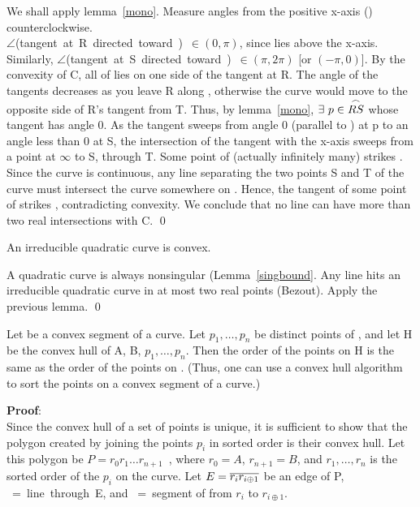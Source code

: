 We shall apply lemma~\ref{mono}.  Measure angles from the positive
x-axis () counterclockwise.\\
$\angle$(tangent~at~R~directed~toward~)~$\in (0,\pi)$, since 
lies above the x-axis.
Similarly, $\angle$(tangent~at~S~directed~toward~)~$\in (\pi,2\pi)$
[or $(-\pi,0)$].
By the convexity of C, all of  lies on one side of the tangent
at R.
\hence The angle of the tangents decreases as you leave R along , 
otherwise the curve would move to the opposite side of R's tangent from T.
Thus, by lemma~\ref{mono}, $\exists~p \in \mbox{$\stackrel{\frown}{RS}$}$ whose tangent has
angle 0.  As the tangent sweeps from angle 0 (parallel to ) at p
to an angle less than 0 at S, the intersection of the tangent with the 
x-axis  sweeps from a point at $\infty$ to S, through T.
\hence Some point of  (actually infinitely many) strikes .
Since the curve is continuous, any line separating the two points S and T
of the curve must intersect the curve somewhere on .  Hence, the 
tangent of some point of  strikes , 
contradicting convexity.
We conclude that no line can have more than two real intersections
with C.
\qed
\begin{corollary}
An irreducible quadratic curve is convex.
\end{corollary}
\proof
A quadratic curve is always nonsingular (Lemma~\ref{singbound}.
Any line hits an irreducible quadratic curve in at most two real
points (Bezout).  Apply the previous lemma.
\qed
\begin{lemma}\nopagebreak
Let  be a convex segment of a curve.  Let $p_{1},\ldots,p_{n}$
be distinct points of , and let H be the convex hull of A, B, 
$p_{1},\ldots,p_{n}$.  Then the order of the points on H is the same
 as the order of the points on .  (Thus, one can use a convex hull
algorithm to sort the points on a convex segment of a curve.)
\end{lemma}
{\bf Proof}:\nopagebreak\\
Since the convex hull of a set of points is unique, it is sufficient to
 show that the polygon created by joining the points $p_{i}$ in sorted
order is their convex hull.  Let this polygon 
be $P = r_{0}r_{1}\ldots r_{n+1}$\ , where $r_{0} = A$, $r_{n+1} = B$, and
$r_{1},\ldots ,r_{n}$ is the sorted order of the $p_{i}$ on the curve.
Let $E = \mbox{$\overline{r_{i}r_{i\oplus 1}}$}$ be an edge of P, ~=~line~through~E,
and ~=~segment of  from $r_{i}$ to $r_{i\oplus 1}$.
